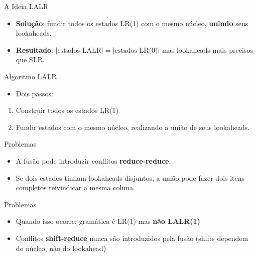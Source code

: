 \begin{frame}{A Ideia LALR}

    \begin{itemize}
        \item
        \textbf{Solução}: fundir todos os estados LR(1) com o mesmo núcleo,
        \textbf{unindo} seus lookaheads.
        \item
        \textbf{Resultado}: \(|\text{estados LALR}| = |\text{estados LR(0)}|\)
        mas lookaheads mais precisos que SLR.
    \end{itemize}
\end{frame}

\begin{frame}{Algoritmo LALR}

    \begin{itemize}

        \item
        Dois passos:
    \end{itemize}

    \begin{enumerate}

        \item
        Construir todos os estados LR(1)
        \item
        Fundir estados com o mesmo núcleo, realizando a união de seus
        lookaheads.
    \end{enumerate}
\end{frame}

\begin{frame}{Problemas}

    \begin{itemize}
        \item
        A fusão pode introduzir conflitos \textbf{reduce-reduce}:
        \item
        Se dois estados tinham lookaheads disjuntos, a união pode fazer dois
        itens completos reivindicar a mesma coluna.
    \end{itemize}
\end{frame}

\begin{frame}{Problemas}

    \begin{itemize}

        \item
        Quando isso ocorre: gramática é LR(1) mas \textbf{não LALR(1)}
        \item
        Conflitos \textbf{shift-reduce} nunca são introduzidos pela fusão
        (shifts dependem do núcleo, não do lookahead)
    \end{itemize}
\end{frame}

